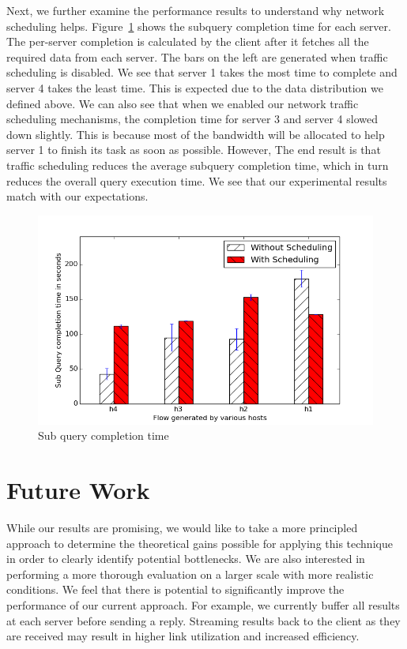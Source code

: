 \documentclass{sig-alternate-2013}
\begin{document}
Next, we further examine the performance results to understand why network scheduling helps.
Figure~\ref{fig:sub_query_completion_8} shows the subquery completion time for each server.
The per-server completion is calculated by the client after it fetches all the required data from each server.
The bars on the left are generated when traffic scheduling is disabled.
We see that server 1 takes the most time to complete and server 4 takes the least time.
This is expected due to the data distribution we defined above.
We can also see that when we enabled our network traffic scheduling mechanisms, the completion time for server 3 and server 4 slowed down slightly.
This is because most of the bandwidth will be allocated to help server 1 to finish its task as soon as possible.
However, The end result is that traffic scheduling reduces the average subquery completion time, which in turn reduces the overall query execution time.
We see that our experimental results match with our expectations.

\begin{figure}
    \centering
    \includegraphics[scale=0.47]{figures/simple_topo_closer_8.png}
    \caption{Sub query completion time}\label{fig:sub_query_completion_8}
\end{figure}

\section{Future Work}

While our results are promising, we would like to take a more principled approach to determine the theoretical gains possible for applying this technique in order to clearly identify potential bottlenecks.
We are also interested in performing a more thorough evaluation on a larger scale with more realistic conditions.
We feel that there is potential to significantly improve the performance of our current approach.
For example, we currently buffer all results at each server before sending a reply.
Streaming results back to the client as they are received may result in higher link utilization and increased efficiency.
\end{document}
